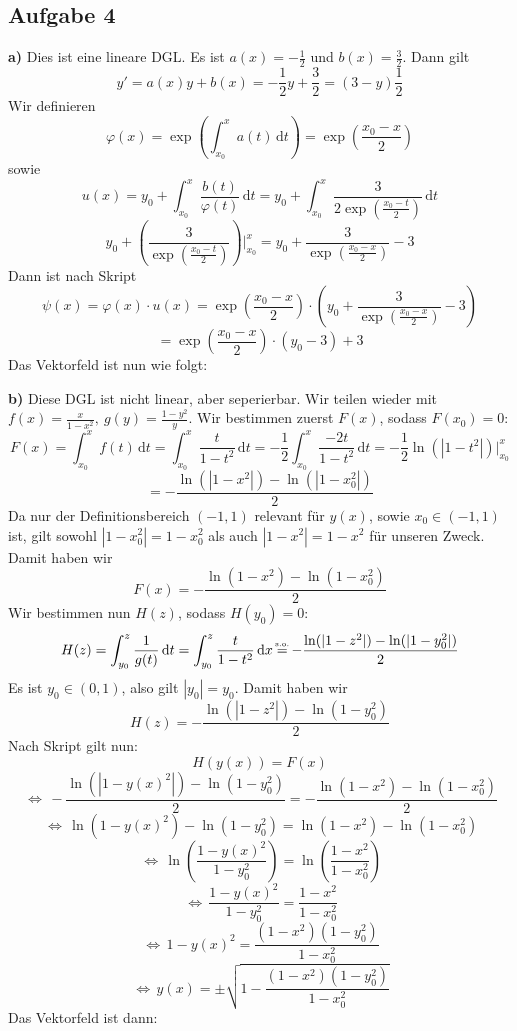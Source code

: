 \documentclass[a4paper,graphics,11pt]{article}
\newcommand{\aufgabe}[1]{\subsection*{Aufgabe #1}}
\newcommand{\up}[2]{\mathrel{\overset{\makebox[0pt]{\mbox{\normalfont\tiny #2}}}{#1}}}
\begin{document}
\newpage
\aufgabe{4}
\textbf{a)}
Dies ist eine lineare DGL. Es ist $a(x) = -\frac{1}{2}$ und $b(x) = \frac{3}{2}$. Dann gilt
$$
	y' = a(x)y+b(x) = -\frac{1}{2}y+\frac{3}{2} = (3-y)\frac{1}{2}
$$
Wir definieren
$$
	\varphi(x) = \exp\left(\int_{x_0}^{x} a(t)\, \mathrm{d}t\right) = \exp\left(\frac{x_0-x}{2}\right)
$$
sowie
$$
	u(x) = y_0 + \int_{x_0}^{x} \frac{b(t)}{\varphi(t)}\, \mathrm{d}t
	= y_0 + \int_{x_0}^{x} \frac{3}{2\exp\left(\frac{x_0-t}{2}\right)}\, \mathrm{d}t
$$$$
	y_0 + \left(\frac{3}{\exp(\frac{x_0-t}{2})}\right)\bigg|_{x_0}^x
	= y_0 + \frac{3}{\exp(\frac{x_0-x}{2})} -3
$$
Dann ist nach Skript
$$
	\psi(x) = \varphi(x)\cdot u(x)
	= \exp\left(\frac{x_0-x}{2}\right) \cdot\left(y_0 + \frac{3}{\exp(\frac{x_0-x}{2})} -3\right)
$$$$
	= \exp\left(\frac{x_0-x}{2}\right) \cdot\left(y_0-3\right)+3
$$
Das Vektorfeld ist nun wie folgt:

\newpage
\textbf{b)}
Diese DGL ist nicht linear, aber seperierbar.
Wir teilen wieder mit $f(x) = \frac{x}{1-x^2},\ g(y) = \frac{1-y^2}{y}$.
Wir bestimmen zuerst $F(x)$, sodass $F(x_0) = 0$:
$$
	F(x) =
	\int_{x_0}^{x} f(t)\, \mathrm{d}t
	= \int_{x_0}^{x} \frac{t}{1-t^2}\, \mathrm{d}t
	= -\frac{1}{2}\int_{x_0}^{x} \frac{-2t}{1-t^2}\, \mathrm{d}t
	= -\frac{1}{2}\ln(|1-t^2|)\big|_{x_0}^x
$$$$
	= -\frac{\ln(|1-x^2|)-\ln(|1-x_0^2|)}{2}
$$
Da nur der Definitionsbereich $(-1,1)$ relevant für $y(x)$, sowie $x_0 \in (-1,1)$ ist, gilt sowohl
$|1-x_0^2| = 1-x_0^2$ als auch $|1-x^2| = 1-x^2$ für unseren Zweck. Damit haben wir
$$
	F(x) = -\frac{\ln(1-x^2)-\ln(1-x_0^2)}{2}
$$Wir bestimmen nun $H(z)$, sodass
$H(y_0) = 0$:
$$
	H(z) = \int_{y_0}^{z} \frac{1}{g(t)}\, \mathrm{d}t
	= \int_{y_0}^{z} \frac{t}{1-t^2}\, \mathrm{d}x \up{=}{s.o.} -\frac{\ln(|1-z^2|)-\ln(|1-y_0^2|)}{2}
$$
Es ist $y_0 \in (0,1)$, also gilt $|y_0| = y_0$. Damit haben wir
$$
	H(z) = -\frac{\ln(|1-z^2|)-\ln(1-y_0^2)}{2}
$$
Nach Skript gilt nun:
$$
	H(y(x)) = F(x)
$$$$
	\,\Longleftrightarrow\, -\frac{\ln(|1-y(x)^2|) -\ln(1-y_0^2)}{2} = -\frac{\ln(1-x^2)-\ln(1-x_0^2)}{2}
$$$$
	\,\Longleftrightarrow\, \ln(1-y(x)^2) -\ln(1-y_0^2) = \ln(1-x^2)-\ln(1-x_0^2)
$$$$
	\,\Longleftrightarrow\, \ln\left(\frac{1-y(x)^2}{1-y_0^2}\right) = \ln\left(\frac{1-x^2}{1-x_0^2}\right)
$$$$
	\,\Longleftrightarrow\, \frac{1-y(x)^2}{1-y_0^2} = \frac{1-x^2}{1-x_0^2}
$$$$
	\,\Longleftrightarrow\, 1-y(x)^2 = \frac{(1-x^2)(1-y_0^2)}{1-x_0^2}
$$$$
	\,\Longleftrightarrow\, y(x) = \pm\sqrt{1-\frac{(1-x^2)(1-y_0^2)}{1-x_0^2}}
$$
Das Vektorfeld ist dann:
\end{document}

